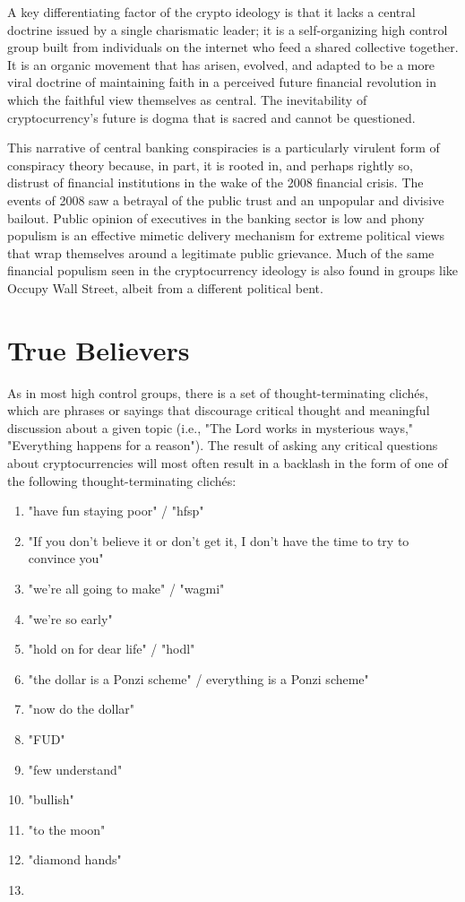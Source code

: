 A key differentiating factor of the crypto ideology is that it lacks a central
doctrine issued by a single charismatic leader; it is a self-organizing high
control group built from individuals on the internet who feed a shared
collective together. It is an organic movement that has arisen, evolved, and
adapted to be a more viral doctrine of maintaining faith in a perceived future
financial revolution in which the faithful view themselves as central. The
inevitability of cryptocurrency's future is dogma that is sacred and cannot be
questioned.


This narrative of central banking conspiracies is a particularly virulent form
of conspiracy theory because, in part, it is rooted in, and perhaps rightly so,
distrust of financial institutions in the wake of the 2008 financial crisis. The
events of 2008 saw a betrayal of the public trust and an unpopular and divisive
bailout. Public opinion of executives in the banking sector is low and phony
populism is an effective mimetic delivery mechanism for extreme political views
that wrap themselves around a legitimate public grievance. Much of the same
financial populism seen in the cryptocurrency ideology is also found in groups
like Occupy Wall Street, albeit from a different political bent.

\section{True Believers}

As in most high control groups, there is a set of thought-terminating clichés,
which are phrases or sayings that discourage critical thought and meaningful
discussion about a given topic (i.e., "The Lord works in mysterious ways,"
"Everything happens for a reason"). The result of asking any critical questions
about cryptocurrencies will most often result in a backlash in the form of one
of the following thought-terminating clichés:

\begin{enumerate}
  \item "have fun staying poor" / "hfsp"
  \item "If you don't believe it or don't get it, I don't have the time to try to convince you"
  \item "we're all going to make" / "wagmi"
  \item "we're so early"
  \item "hold on for dear life" / "hodl"
  \item "the dollar is a Ponzi scheme" / everything is a Ponzi scheme"
  \item "now do the dollar"
  \item "FUD"
  \item "few understand"
  \item "bullish"
  \item "to the moon"
  \item "diamond hands"
  \item 🤡
\end{enumerate}

